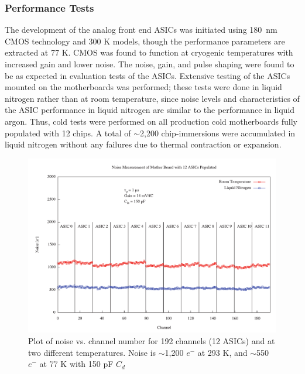 \subsubsection{Performance Tests}

The development of the analog front end ASICs was initiated using 180~nm CMOS technology and 300 K models, though the performance parameters are extracted at 77 K. CMOS was found to function at cryogenic temperatures with increased gain and lower noise. The noise, gain, and pulse shaping were found to be as expected in evaluation tests of the ASICs. Extensive testing of the ASICs mounted on the motherboards was performed; these tests were done in liquid nitrogen rather than at room temperature, since noise levels and characteristics of the ASIC performance in liquid nitrogen are similar to the performance in liquid argon.  Thus, cold tests were performed on all production cold motherboards fully populated with 12 chips. A total of $\sim$2,200 chip-immersions were accumulated in liquid nitrogen without any failures due to thermal contraction or expansion. 

\begin{figure}[hbt]
\begin{center}
\includegraphics[scale=0.4]{figures/noise.pdf}
\end{center}
\caption{\label{fig:fignoise}Plot of noise vs. channel number for 192 channels (12 ASICs) and at two different temperatures. Noise is $\sim$1,200 $e^{-}$ at 293 K, and $\sim$550 $e^{-}$ at 77 K with 150 pF $C_{d}$}
\end{figure}

